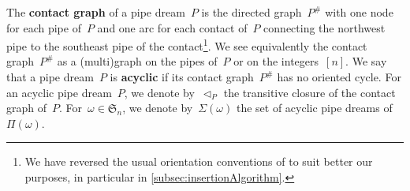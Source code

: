 \documentclass[reqno]{amsart}
\theoremstyle{definition}
\newcommand{\defn}[1]{\textbf{\textsf{\color{PineGreen} #1}}} %
\newcommand{\fS}{\mathfrak{S}} %
\newcommand{\pipeDreams}{\Pi} %
\newcommand{\contact}{^\#} %
\newcommand{\acyclicPipeDreams}{\Sigma} %
\newcommand{\less}{\vartriangleleft} %
\newcommand{\contactLess}[1]{\less_{#1}} %
\begin{document}
The \defn{contact graph} of a pipe dream~$P$ is the directed graph~$P\contact$ with one node for each pipe of~$P$ and one arc for each contact of~$P$ connecting the northwest pipe to the southeast pipe of the contact\footnote{We have reversed the usual orientation conventions of \cite{PilaudSantos-brickPolytope, PilaudPocchiola, Pilaud-brickAlgebra} to suit better our purposes, in particular in \cref{subsec:insertionAlgorithm}.}.
We see equivalently the contact graph~$P\contact$ as a (multi)graph on the pipes of~$P$ or on the integers~$[n]$.
We say that a pipe dream~$P$ is \defn{acyclic} if its contact graph~$P\contact$ has no oriented cycle.
For an acyclic pipe dream~$P$, we denote by~$\contactLess{P}$ the transitive closure of the contact graph of~$P$.
For~$\omega \in \fS_n$, we denote by~$\acyclicPipeDreams(\omega)$ the set of acyclic pipe dreams of~$\pipeDreams(\omega)$.
\end{document}
